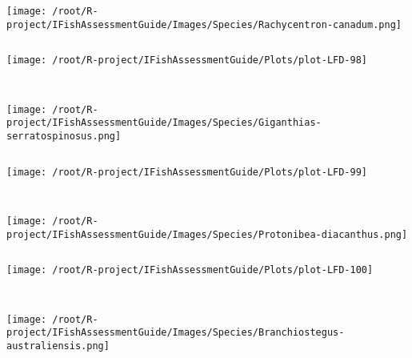 \begin{knitrout}
\begin{kframe}
\begin{verbatim}
\end{verbatim}
\end{kframe}
\texttt{[image: /root/R-project/IFishAssessmentGuide/Images/Species/Rachycentron-canadum.png]}
\begin{kframe}\begin{verbatim}
\end{verbatim}
\end{kframe}
\texttt{[image: /root/R-project/IFishAssessmentGuide/Plots/plot-LFD-98]} 
\begin{kframe}\begin{verbatim}
 
\end{verbatim}
\end{kframe}
\texttt{[image: /root/R-project/IFishAssessmentGuide/Images/Species/Giganthias-serratospinosus.png]}
\begin{kframe}\begin{verbatim}
\end{verbatim}
\end{kframe}
\texttt{[image: /root/R-project/IFishAssessmentGuide/Plots/plot-LFD-99]} 
\begin{kframe}\begin{verbatim}
 
\end{verbatim}
\end{kframe}
\texttt{[image: /root/R-project/IFishAssessmentGuide/Images/Species/Protonibea-diacanthus.png]}
\begin{kframe}\begin{verbatim}
\end{verbatim}
\end{kframe}
\texttt{[image: /root/R-project/IFishAssessmentGuide/Plots/plot-LFD-100]} 
\begin{kframe}\begin{verbatim}
 
\end{verbatim}
\end{kframe}
\texttt{[image: /root/R-project/IFishAssessmentGuide/Images/Species/Branchiostegus-australiensis.png]}
\begin{kframe}\begin{verbatim}
\end{verbatim}
\end{kframe}
\end{knitrout}
